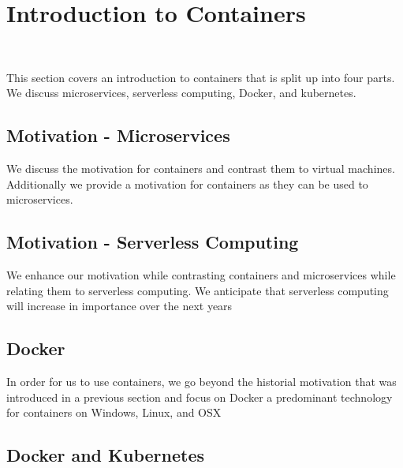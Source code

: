 
\chapter{Introduction to Containers}
\label{c:container}

\FILENAME\

This section covers an introduction to containers that is split up
into four parts. We discuss microservices, serverless computing,
Docker, and kubernetes.

\section{Motivation - Microservices}
\label{s:motivation-microservices}

We discuss the motivation for containers and contrast them to virtual
machines. Additionally we provide a motivation for containers as they
can be used to microservices.


\section{Motivation - Serverless Computing}
\label{s:motivation-serverless}

We enhance our motivation while contrasting containers and
microservices while relating them to serverless computing. We
anticipate that serverless computing will increase in importance over
the next years


\section{Docker}
\label{s:motivation-docker}

In order for us to use containers, we go beyond the historial
motivation that was introduced in a previous section and focus on
Docker a predominant technology for containers on Windows, Linux, and
OSX


\section{Docker and Kubernetes}
\label{s:motivation-docker-kubernetes}

